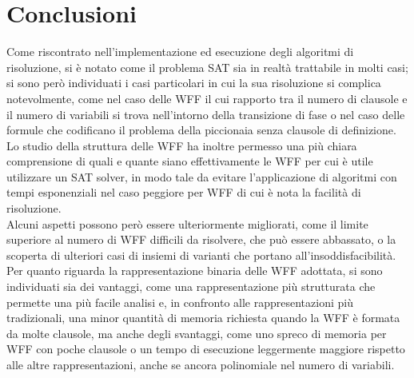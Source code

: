 \chapter{Conclusioni}
Come riscontrato nell'implementazione ed esecuzione degli algoritmi di risoluzione, si è notato come il problema SAT sia in realtà trattabile in molti casi; si sono però individuati i casi particolari in cui la sua risoluzione si complica notevolmente, come nel caso delle WFF il cui rapporto tra il numero di clausole e il numero di variabili si trova nell'intorno della transizione di fase o nel caso delle formule che codificano il problema della piccionaia senza clausole di definizione.\\
Lo studio della struttura delle WFF ha inoltre permesso una più chiara comprensione di quali e quante siano effettivamente le WFF per cui è utile utilizzare un SAT solver, in modo tale da evitare l'applicazione di algoritmi con tempi esponenziali nel caso peggiore per WFF di cui è nota la facilità di risoluzione.\\
Alcuni aspetti possono però essere ulteriormente migliorati, come il limite superiore al numero di WFF difficili da risolvere, che può essere abbassato, o la scoperta di ulteriori casi di insiemi di varianti che portano all'insoddisfacibilità.\\
Per quanto riguarda la rappresentazione binaria delle WFF adottata, si sono individuati sia dei vantaggi, come una rappresentazione più strutturata che permette una più facile analisi e, in confronto alle rappresentazioni più tradizionali, una minor quantità di memoria richiesta quando la WFF è formata da molte clausole, ma anche degli svantaggi, come uno spreco di memoria per WFF con poche clausole o un tempo di esecuzione leggermente maggiore rispetto alle altre rappresentazioni, anche se ancora polinomiale nel numero di variabili.